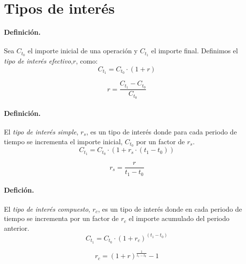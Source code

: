 
\section{Tipos de inter\'es}
\label{sec:interests}

\paragraph{Definici\'on.}
Sea $C_{t_0}$ el importe inicial de una operaci\'on y $C_{t_1}$ el importe final. 
Definimos el \emph{tipo de inter\'es efectivo},$r$,
como:
\begin{equation}
C_{t_1} = C_{t_0} \cdot (1+r)
\end{equation}

\begin{equation}
\label{tipus_efectiu}
r = \frac{C_{t_1}-C_{t_0}}{C_{t_0}}
\end{equation}

\paragraph{Definici\'on.}
El \emph{tipo de inter\'es simple}, $r_s$, es un tipo
de inter\'es donde para cada periodo de tiempo se incrementa el importe inicial, $C_{t_0}$
por un factor de $r_s$.
\begin{equation}
C_{t_1} = C_{t_0} \cdot (1+ r_s \cdot (t_1-t_0))
\end{equation}

\begin{equation}
\label{interes_simple_1}
r_s = \frac{r}{t_1 - t_0}
\end{equation}

\paragraph{Defici\'on.}
El \emph{tipo de inter\'es compuesto}, $r_c$, es un tipo
de inter\'es donde en cada periodo de tiempo se incrementa por un factor de $r_c$ el importe
acumulado del periodo anterior.
\begin{equation}
C_{t_1} = C_{t_0} \cdot (1+ r_c)^{(t_1-t_0)} 
\end{equation}

\begin{equation}
\label{interes_compuesto_1}
r_c = (1 + r) ^ \frac{1}{t_1-t_0} - 1
\end{equation}

